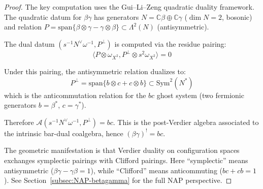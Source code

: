 \begin{proof}
The key computation uses the Gui--Li--Zeng quadratic duality framework. The quadratic datum for $\beta\gamma$ has generators $N = \mathbb{C}\beta \oplus \mathbb{C}\gamma$ ($\dim N = 2$, bosonic) and relation $P = \mathrm{span}\{\beta \otimes \gamma - \gamma \otimes \beta\} \subset \Lambda^2(N)$ (antisymmetric).

The dual datum $(s^{-1}N^\vee\omega^{-1}, P^\perp)$ is computed via the residue pairing:
\[\langle P \otimes \omega_{X^2}, P^\perp \otimes s^2\omega_{X^2}\rangle = 0\]

Under this pairing, the antisymmetric relation dualizes to:
\[P^\perp = \mathrm{span}\{b \otimes c + c \otimes b\} \subset \mathrm{Sym}^2(N^*)\]
which is the anticommutation relation for the $bc$ ghost system (two fermionic generators $b = \beta^*$, $c = \gamma^*$).

Therefore
$\mathcal{A}(s^{-1}N^\vee\omega^{-1}, P^\perp)=bc$. This is the
post-Verdier algebra associated to the intrinsic bar-dual coalgebra,
hence $(\beta\gamma)^! = bc$.

The geometric manifestation is that Verdier duality on configuration spaces
exchanges symplectic pairings with Clifford pairings. Here ``symplectic''
means antisymmetric ($\beta\gamma - \gamma\beta = 1$), while ``Clifford'' means anticommuting ($bc + cb = 1$).
See Section~\ref{subsec:NAP-betagamma} for the full NAP perspective.
\end{proof}

